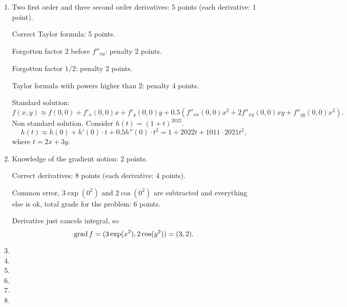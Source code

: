 \begin{enumerate}
    \item Two first order and three second order derivatives: 5 points (each derivative: 1 point).
    
    Correct Taylor formula: 5 points. 

    Forgotten factor $2$ before $f''_{xy}$: penalty 2 points.

    Forgotten factor $1/2$: penalty 2 points.

    Taylor formula with powers higher than 2: penalty 4 points. 

    Standard solution:
    \[
    f(x, y) \approx f(0, 0) + f'_x(0, 0) x + f'_y(0, 0) y + 0.5 (f''_{xx}(0, 0) x^2 + 2f''_{xy}(0, 0) xy + f''_{yy}(0, 0) x^2).
    \]
    Non standard solution. Consider $h(t) = (1 + t)^{2022}$.
    \[
    h(t)  \approx h(0) + h'(0) \cdot t + 0.5 h''(0)\cdot t^2 = 1 + 2022t + 1011 \cdot 2021 t^2,
    \]
    where $t = 2x + 3y$.


    \item Knowledge of the gradient notion: 2 points. 
    
    Correct derivatives: 8 points (each derivative: 4 points).

    Common error, $3\exp(0^2)$ and $2\cos(0^2)$ are subtracted and everything else is ok, 
    total grade for the problem: 6 points.

    Derivative just cancels integral, so
    \[
        \mathrm{grad}\, f = (3 \exp(x^2), 2 \cos(y^2)) = (3, 2).
    \]
    
    \item 
    \item 
    \item 
    \item 
    \item 
    \item 
\end{enumerate}
